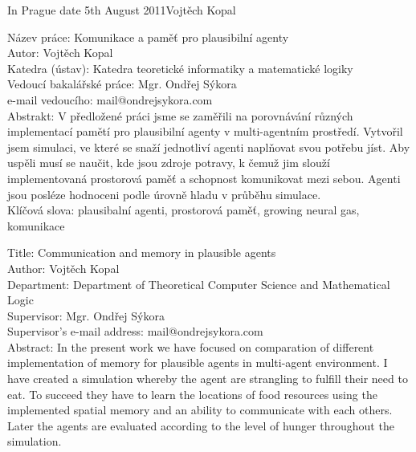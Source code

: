 \documentclass[12pt,a4paper]{report}
\begin{document}
\bigskip
\noindent In Prague date 5th August 2011\hspace{\fill}Vojtěch Kopal\\ %


\setcounter{tocdepth}{1}
\tableofcontents %

\newpage %

\noindent
Název práce: Komunikace a pamě\v{t} pro plausibilní agenty\\
Autor: Vojtěch Kopal\\
Katedra (ústav): Katedra teoretické informatiky a matematické logiky\\
Vedoucí bakalářské práce: Mgr. Ondřej Sýkora\\
e-mail vedoucího: mail@ondrejsykora.com\\

\noindent Abstrakt:  V předložené práci jsme se zaměřili na porovnávání různých implementací pamětí pro plausibilní agenty v multi-agentním prostředí. Vytvořil jsem simulaci, ve které se snaží jednotliví agenti naplňovat svou potřebu jíst. Aby uspěli musí se naučit, kde jsou zdroje potravy, k čemuž jim slouží implementovaná prostorová paměť a schopnost komunikovat mezi sebou. Agenti jsou posléze hodnoceni podle úrovně hladu v průběhu simulace. \\

\noindent Klíčová slova: plausibalní agenti, prostorová paměť, growing neural gas, komunikace

\vspace{10mm}

\noindent
Title: Communication and memory in plausible agents\\
Author: Vojtěch Kopal\\
Department: Department of Theoretical Computer Science and Mathematical Logic\\
Supervisor: Mgr. Ondřej Sýkora\\
Supervisor's e-mail address: mail@ondrejsykora.com\\

\noindent Abstract: In the present work we have focused on comparation of different implementation of memory for plausible agents in multi-agent environment. I have created a simulation whereby the agent are strangling to fulfill their need to eat. To succeed they have to learn the locations of food resources using the implemented spatial memory and an ability to communicate with each others. Later the agents are evaluated according to the level of hunger throughout the simulation.\\
\end{document}
